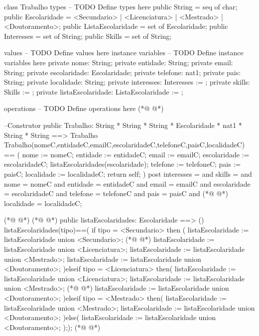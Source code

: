 \begin{vdmpp}[breaklines=true]
class Trabalho
types
-- TODO Define types here
 public String = seq of char;
 public Escolaridade = <Secundario> | <Licenciatura> | <Mestrado> | <Doutoramento>;
 public ListaEscolaridade = set of Escolaridade;
 public Interesses = set of String;
 public Skills = set of String;
 
values
-- TODO Define values here
instance variables
-- TODO Define instance variables here
 private nome: String;
 private entidade: String;
 private email: String;
 private escolaridade: Escolaridade;
 private telefone: nat1;
 private pais: String;
 private localidade: String;
 private interesses: Interesses := {};
 private skills: Skills := {};
 private listaEscolaridade: ListaEscolaridade := {};
 
operations
-- TODO Define operations here
(*@
\label{Trabalho:27}
@*)

 --Construtor
 public Trabalho: String * String * String * Escolaridade * nat1 * String * String ==> Trabalho
 Trabalho(nomeC,entidadeC,emailC,escolaridadeC,telefoneC,paisC,localidadeC) == (
  nome := nomeC;
  entidade := entidadeC;
  email := emailC;
  escolaridade := escolaridadeC;
  listaEscolaridades(escolaridade);
  telefone := telefoneC;
  pais := paisC;
  localidade := localidadeC;
  return self;
 )
 post interesses = {} and
   skills = {} and
   nome = nomeC and
   entidade = entidadeC and
   email = emailC and
   escolaridade = escolaridadeC and
   telefone = telefoneC and
   pais = paisC and
(*@
\label{addInteresse:49}
@*)
   localidade = localidadeC;
  
(*@
\label{mapEscolaridades:51}
@*)
(*@
\label{listaEscolaridades:51}
@*)
 public listaEscolaridades: Escolaridade ==> ()
 listaEscolaridades(tipo)==(
 if tipo = <Secundario> then (
  listaEscolaridade := listaEscolaridade union {<Secundario>};
(*@
\label{removeInteresse:55}
@*)
  listaEscolaridade := listaEscolaridade union {<Licenciatura>};
  listaEscolaridade := listaEscolaridade union {<Mestrado>};
  listaEscolaridade := listaEscolaridade union {<Doutoramento>};
 )elseif tipo = <Licenciatura> then(
  listaEscolaridade := listaEscolaridade union {<Licenciatura>};
  listaEscolaridade := listaEscolaridade union {<Mestrado>};
(*@
\label{getInteresses:61}
@*)
  listaEscolaridade := listaEscolaridade union {<Doutoramento>};
 )elseif tipo = <Mestrado> then(
  listaEscolaridade := listaEscolaridade union {<Mestrado>};
  listaEscolaridade := listaEscolaridade union {<Doutoramento>};
 )else(
  listaEscolaridade := listaEscolaridade union {<Doutoramento>};
 ););
(*@
\label{addSkills:68}
@*)


\end{vdmpp}
